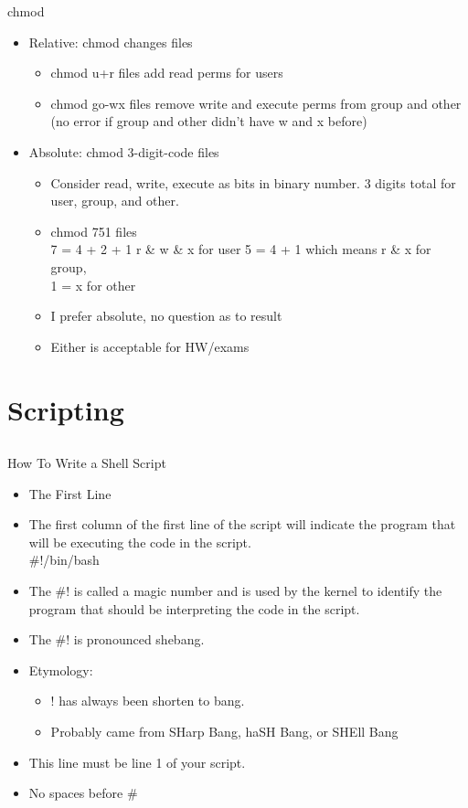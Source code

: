 \documentclass{beamer}
\begin{document}
\begin{frame}{chmod}
\begin{itemize}
\item Relative: chmod changes files
\begin{itemize}
\item chmod u+r files add read perms for users
\item chmod go-wx files	remove write and execute perms from group and other (no error if group and other didn't have w and x before)
\end{itemize}
\item Absolute: chmod 3-digit-code files
\begin{itemize}
\item Consider read, write, execute as bits in binary number.  3 digits total for user, group, and other.
\item chmod 751 files \\
7 = 4 + 2 + 1 r \& w \& x for user
5 = 4 + 1 which means r \& x for group, \\
1 = x for other
\item I prefer absolute, no question as to result
\item Either is acceptable for HW/exams
\end{itemize}
\end{itemize}
\end{frame}

\section{Scripting}
\subsection{}

\begin{frame}{How To Write a Shell Script}
\begin{itemize}
\item The First Line
\item The first column of the first line of the script will indicate the program that will be executing the code in the script.\\
\#!/bin/bash 
\item The \#! is called a magic number and is used by the kernel to identify the program that should be interpreting the code in the script.
\item The \#! is pronounced shebang.
\item Etymology: 
\begin{itemize}
\item ! has always been shorten to bang.
\item Probably came from SHarp Bang, haSH Bang, or SHEll Bang
\end{itemize}
\item This line must be line 1 of your script.
\item No spaces before \#
\end{itemize}
\end{frame}
\end{document}
